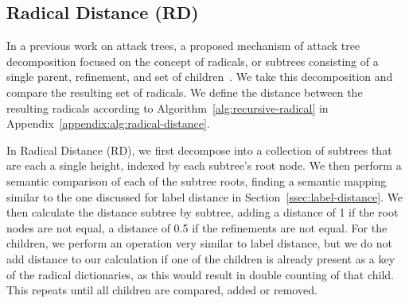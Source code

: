 



\subsection{Radical Distance (RD)}
\label{ssec:rd}

In a previous work on attack trees, a proposed mechanism of attack tree decomposition focused on the concept of radicals, or subtrees consisting of a single parent, refinement, and set of children~\cite{schiele2021novel}. We take this decomposition and compare the resulting set of radicals. We define the distance between the resulting radicals according to Algorithm~\ref{alg:recursive-radical} in Appendix~\ref{appendix:alg:radical-distance}.

In Radical Distance (RD), we first decompose into a collection of subtrees that are each a single height, indexed by each subtree's root node. We then perform a semantic comparison of each of the subtree roots, finding a semantic mapping similar to the one discussed for label distance in Section~\ref{ssec:label-distance}. We then calculate the distance subtree by subtree, adding a distance of 1 if the root nodes are not equal, a distance of 0.5 if the refinements are not equal. For the children, we perform an operation very similar to label distance, but we do not add distance to our calculation if one of the children is already present as a key of the radical dictionaries, as this would result in double counting of that child. This repeats until all children are compared, added or removed.

